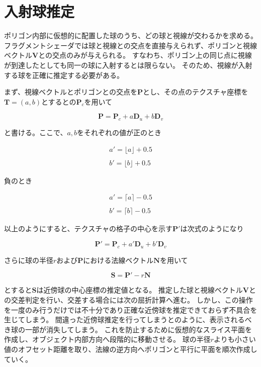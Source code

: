 \section{入射球推定}
\label{SFirstsphere}

ポリゴン内部に仮想的に配置した球のうち、どの球と視線が交わるかを求める。
フラグメントシェーダでは球と視線との交点を直接与えられず、ポリゴンと視線ベクトル$\bm{V}$との交点のみが与えられる。
すなわち、ポリゴン上の同じ点に視線が到達したとしても同一の球に入射するとは限らない。
そのため、視線が入射する球を正確に推定する必要がある。

まず、視線ベクトルとポリゴンとの交点を$\bm{P}$とし、その点のテクスチャ座標を$\bm{T} = (a, b)$とするとの$\bm{P}_c$を用いて

\begin{equation}
\label{EP}
\bm{P} = \bm{P}_c + a\bm{D}_u + b\bm{D}_v
\end{equation}

\noindent
と書ける。ここで、$a, b$をそれぞれの値が正のとき

\begin{eqnarray}
\label{Eadashplus}
a' = \lfloor a \rfloor + 0.5\\
\nonumber\\
\label{Ebdashplus}
b' = \lfloor b \rfloor + 0.5
\end{eqnarray}

\noindent
負のとき

\begin{eqnarray}
\label{Eadashminus}
a' = \lceil a \rceil - 0.5\\
\nonumber\\
\label{Ebdashminus}
b' = \lceil b \rceil - 0.5
\end{eqnarray}

\noindent
以上のようにすると、テクスチャの格子の中心を示す$\bm{P}'$は次式のようになり

\begin{equation}
\bm{P}' = \bm{P}_c + a'\bm{D}_u + b'\bm{D}_v 
\label{EPdash}
\end{equation}

\noindent
さらに球の半径$r$および$\bm{P}$における法線ベクトル$\bm{N}$を用いて

\begin{equation}
\bm{S} = \bm{P}' - r\bm{N} 
\label{ESpherepos}
\end{equation}

\noindent
とすると$\bm{S}$は近傍球の中心座標の推定値となる。
推定した球と視線ベクトル$\bm{V}$との交差判定を行い、交差する場合には次の屈折計算へ進む。
しかし、この操作を一度のみ行うだけでは不十分であり正確な近傍球を推定できておらず不具合を生じてしまう。
間違った近傍球推定を行ってしまうと\figref{}のように、表示されるべき球の一部が消失してしまう。
これを防止するために仮想的なスライス平面を作成し、オブジェクト内部方向へ段階的に移動させる\figref{}。
球の半径$r$よりも小さい値のオフセット距離を取り、法線の逆方向へポリゴンと平行に平面を順次作成していく。

